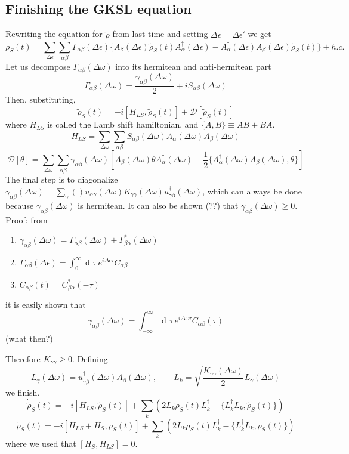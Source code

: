 \documentclass[a4paper, 11pt]{article}
\newcommand{\dd}{\mathop{\mathrm{d}\!}{}}
\begin{document}
	\subsection{Finishing the GKSL equation}
	Rewriting the equation for $\dot{\tilde{\rho}}$ from last time and setting $\Delta\epsilon=\Delta\epsilon'$ we get
	\[ \dot{\tilde{\rho}}_S(t) = \sum_{\Delta\epsilon} \sum_{\alpha\beta} 
	\Gamma_{\alpha\beta}(\Delta\epsilon) \{ A_\beta(\Delta\epsilon) \tilde{\rho}_S(t) A_\alpha^\dagger(\Delta\epsilon)
	- A_\alpha^\dagger(\Delta\epsilon) A_\beta(\Delta\epsilon) \tilde{\rho}_S(t) \} + h.c. \]
	Let us decompose $\Gamma_{\alpha\beta}(\Delta\omega)$ into its hermitean and anti-hermitean part
	\[ \Gamma_{\alpha\beta}(\Delta\omega) = \dfrac{\gamma_{\alpha\beta}(\Delta\omega)}{2} + i S_{\alpha\beta} (\Delta\omega) \]
	Then, substituting,
	\[ \dot{\tilde{\rho}}_S(t) = -i[H_{LS}, \tilde{\rho}_S(t)] + \mathcal{D}[\tilde{\rho}_S(t)] \]
	where $H_{LS}$ is called the Lamb shift hamiltonian, and $\{A,B\} \equiv AB+BA$.
	\[ H_{LS} = \sum_{\Delta\omega} \sum_{\alpha\beta} S_{\alpha\beta}(\Delta\omega) A_\alpha^\dagger(\Delta\omega) A_\beta(\Delta\omega) \]
	\[ \mathcal{D}[\theta] = \sum_{\Delta\omega} \sum_{\alpha\beta} \gamma_{\alpha\beta}(\Delta\omega)
	\left[ A_\beta(\Delta\omega) \theta A_\alpha^\dagger(\Delta\omega) - \frac{1}{2} \{A_\alpha^\dagger(\Delta\omega)
	A_\beta(\Delta\omega), \theta\} \right] \]
	The final step is to diagonalize $\gamma_{\alpha\beta}(\Delta\omega) = \sum_\gamma() u_{\alpha\gamma}(\Delta\omega) K_{\gamma\gamma}(\Delta\omega) u^\dagger_{\gamma\beta}(\Delta\omega)$, which can always be done because $\gamma_{\alpha\beta}(\Delta\omega)$ is hermitean. It can also be shown (??) %
	that $\gamma_{\alpha\beta}(\Delta\omega)\ge 0$. Proof: from
	\begin{enumerate}
		\item $\gamma_{\alpha\beta}(\Delta\omega) = \Gamma_{\alpha\beta}(\Delta\omega) + \Gamma^*_{\beta\alpha}(\Delta\omega)$
		\item $\Gamma_{\alpha\beta}(\Delta\epsilon) = \int_{0}^{\infty} \dd \tau\, e^{i\Delta\epsilon\tau} C_{\alpha\beta}$
		\item $C_{\alpha\beta}(t) = C_{\beta\alpha}^*(-\tau)$
	\end{enumerate}
	it is easily shown that
	\[ \gamma_{\alpha\beta}(\Delta\omega) = \int_{-\infty}^{\infty} \dd\tau\, e^{i\Delta\omega \tau} C_{\alpha\beta}(\tau) \]
	(what then?)
	
	Therefore $K_{\gamma\gamma}\ge 0$. Defining
	\[ L_\gamma(\Delta\omega) = u^\dagger_{\gamma\beta}(\Delta\omega)A_\beta(\Delta\omega),
	\qquad L_k = \sqrt{\dfrac{K_{\gamma\gamma}(\Delta\omega)}{2}} L_\gamma(\Delta\omega) \]
	we finish.
	\[ \dot{\tilde{\rho}}_S(t) = -i[H_{LS}, \tilde{\rho}_S(t)] + \sum_k \left( 2L_k \tilde{\rho}_S(t) L_k^\dagger -
	\{ L_k^\dagger L_k, \tilde{\rho}_S(t) \} \right) \]
	\[ \dot{\rho}_S(t) = -i[H_{LS}+H_S, {\rho}_S(t)] + \sum_k \left( 2L_k {\rho}_S(t) L_k^\dagger -
	\{ L_k^\dagger L_k, {\rho}_S(t) \} \right) \]
	where we used that $[H_S, H_{LS}]=0$.%
	
\end{document}
